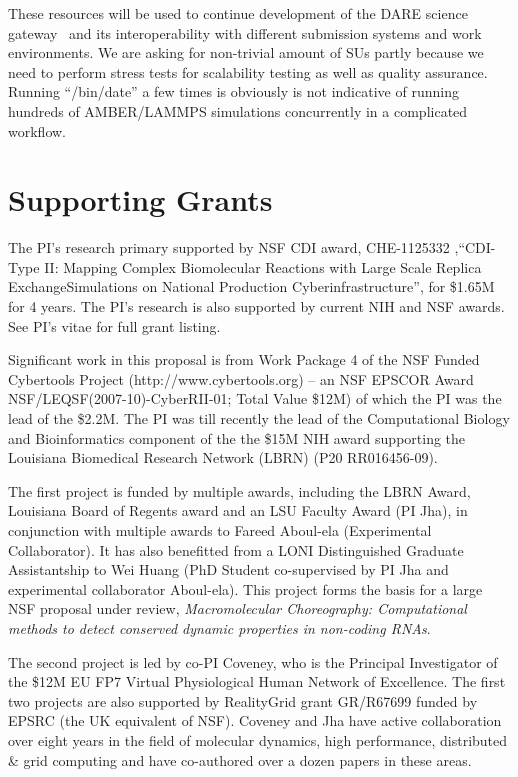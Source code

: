 \documentclass[a4paper,11pt]{article}
\begin{document}
These resources will be used to continue development of the DARE science gateway~\cite{dare-tg11} and its interoperability with different submission systems and work environments. We are asking for non-trivial amount of SUs partly because we need to perform stress tests for scalability testing as well as quality assurance. Running ``/bin/date'' a few times is obviously is not indicative of running hundreds of AMBER/LAMMPS simulations concurrently in a complicated workflow.


\section{Supporting Grants}

The PI's research primary supported by NSF CDI award, CHE-1125332
,``CDI-Type II: Mapping Complex Biomolecular Reactions with Large
Scale Replica ExchangeSimulations on National Production
Cyberinfrastructure'', for \$1.65M for 4 years. The PI's research is
also supported by current NIH and NSF awards.  See PI's vitae for full
grant listing.

Significant work in this proposal is from Work Package 4 of the NSF Funded Cybertools Project (http://www.cybertools.org) -- an NSF EPSCOR Award NSF/LEQSF(2007-10)-CyberRII-01; Total Value \$12M) of which the PI was the lead of the \$2.2M. The PI was till recently the lead of the Computational Biology and Bioinformatics component of the the \$15M NIH award supporting the Louisiana Biomedical Research Network (LBRN) (P20 RR016456-09). %

The first project is funded by multiple awards, including the LBRN Award, Louisiana Board of Regents award and an LSU Faculty Award (PI Jha), in conjunction with multiple awards to Fareed Aboul-ela (Experimental Collaborator). It has also benefitted from a LONI Distinguished Graduate Assistantship to Wei Huang (PhD Student co-supervised by PI Jha and experimental collaborator Aboul-ela). This project forms the basis for a large NSF proposal under review, {\it Macromolecular Choreography: Computational methods to detect conserved dynamic properties in non-coding RNAs}.

The second project is led by co-PI Coveney, who is the Principal Investigator of the \$12M EU FP7 Virtual Physiological Human Network of Excellence. The first two projects are also supported by RealityGrid grant GR/R67699 funded by EPSRC (the UK equivalent of NSF). Coveney and Jha have active collaboration over eight years in the field of molecular dynamics, high performance, distributed \& grid computing and have co-authored over a dozen papers in these areas.
 
\end{document}
